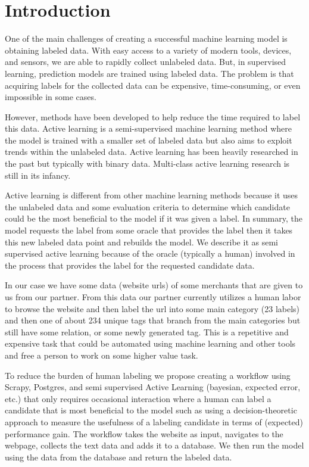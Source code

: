 \chapter*{Introduction}

One of the main challenges of creating a successful machine learning model is obtaining labeled data. With easy access to a variety of modern tools, devices, and sensors, we are able to rapidly collect unlabeled data. But, in supervised learning, prediction models are trained using labeled data. The problem is that acquiring labels for the collected data can be expensive, time-consuming, or even impossible in some cases.  

However, methods have been developed to help reduce the time required to label this data. Active learning is a semi-supervised machine learning method where the model is trained with a smaller set of labeled data but also aims to exploit trends within the unlabeled data. Active learning has been heavily researched in the past but typically with binary data. Multi-class active learning research is still in its infancy. 

Active learning is different from other machine learning methods because it uses the unlabeled data and some evaluation criteria to determine which candidate could be the most beneficial to the model if it was given a label. In summary, the model requests the label from some oracle that provides the label then it takes this new labeled data point and rebuilds the model. We describe it as semi supervised active learning because of the oracle (typically a human) involved in the process that provides the label for the requested candidate data. 

In our case we have some data (website urls) of some merchants that are given to us from our partner. From this data our partner currently utilizes a human labor to browse the website and then label the url into some main category (23 labels) and then one of about 234 unique tags that branch from the main categories but still have some relation, or some newly generated tag. This is a repetitive and expensive task that could be automated using machine learning and other tools and free a person to work on some higher value task. 

To reduce the burden of human labeling we propose creating a workflow using Scrapy, Postgres, and semi supervised Active Learning (bayesian, expected error, etc.) that only requires occasional interaction where a human can label a candidate that is most beneficial to the model such as using a decision-theoretic approach to measure the usefulness of a labeling candidate in terms of (expected) performance gain. The workflow takes the website as input, navigates to the webpage, collects the text data and adds it to a database. We then run the model using the data from the database and return the labeled data. 




